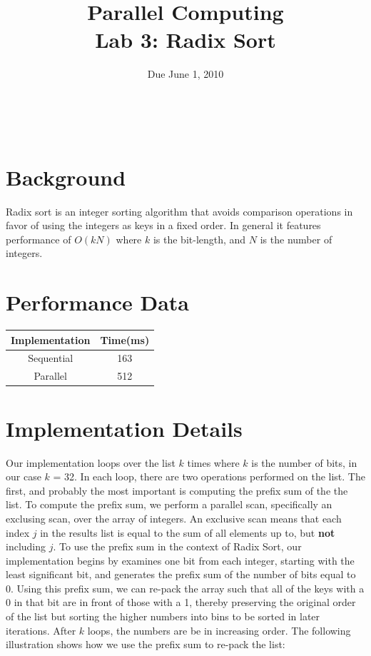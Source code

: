\documentclass[12pt]{article}
\title{ Parallel Computing \\ Lab 3: Radix Sort }
\author{\MyFullName}
\date{ Due June 1, 2010 }
\renewcommand{\indent}{\hspace{0.25in}}
\begin{document}
\maketitle
\thispagestyle{empty}
\begin{center}
\end{center}
\setcounter{page}{0}
\newpage

\def\thesection{\Roman{section}.}
\hfill \\
\section{ Background }

\indent Radix sort is an integer sorting algorithm that avoids comparison operations in favor of using the integers as keys in a fixed order. 
In general it features performance of $O(k N)$ where $k$ is the bit-length, and $N$ is the number of integers.

\section{ Performance Data }
\begin{center}
\begin{tabular}{ c| c }

Implementation & Time(ms) \\ \hline
Sequential & 163 \\ 
Parallel & 512 \\ 
\end{tabular}
\end{center}

\section{ Implementation Details }
\indent  Our implementation loops over the list $k$ times where $k$ is the number of bits, in our case $k$ = 32.   
In each loop, there are two operations performed on the list.  
The first, and probably the most important is computing the prefix sum of the the list.  
To compute the prefix sum, we perform a parallel scan, specifically an exclusing scan, over the array of integers. 
An exclusive scan means that each index $j$ in the results list is equal to the sum of all elements up to, but \textbf{not} including $j$.  
To use the prefix sum in the context of Radix Sort, our implementation begins by examines one bit from each integer, starting with the least significant bit, and generates the prefix sum of the number of bits equal to 0.  
Using this prefix sum, we can re-pack the array such that all of the keys with a 0 in that bit are in front of those with a 1, thereby preserving the original order of the list but sorting the higher numbers into bins to be sorted in later iterations. 
After $k$ loops, the numbers are be in increasing order. 
The following illustration shows how we use the prefix sum to re-pack the list: \\
\end{document}
